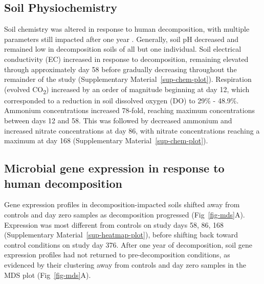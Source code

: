 \documentclass[
  sn-nature,
  lineno, referee]{sn-jnl}
\begin{document}
\subsection{Soil Physiochemistry}\label{soil-physiochemistry}

Soil chemistry was altered in response to human decomposition, with
multiple parameters still impacted after one year
\citep{taylor_transient_2024}. Generally, soil pH decreased and remained
low in decomposition soils of all but one individual. Soil electrical
conductivity (EC) increased in response to decomposition, remaining
elevated through approximately day 58 before gradually decreasing
throughout the remainder of the study
(Supplementary Material~\ref{sup-chem-plot}). Respiration (evolved
CO\textsubscript{2}) increased by an order of magnitude beginning at day
12, which corresponded to a reduction in soil dissolved oxygen (DO) to
29\% - 48.9\%. Ammonium concentrations increased 78-fold, reaching
maximum concentrations between days 12 and 58. This was followed by
decreased ammonium and increased nitrate concentrations at day 86, with
nitrate concentrations reaching a maximum at day 168
(Supplementary Material~\ref{sup-chem-plot}).

\subsection{Microbial gene expression in response to human
decomposition}\label{microbial-gene-expression-in-response-to-human-decomposition}

Gene expression profiles in decomposition-impacted soils shifted away
from controls and day zero samples as decomposition progressed
(Fig~\ref{fig-mds}A). Expression was most different from controls on
study days 58, 86, 168 (Supplementary Material~\ref{sup-heatmap-plot}),
before shifting back toward control conditions on study day 376. After
one year of decomposition, soil gene expression profiles had not
returned to pre-decomposition conditions, as evidenced by their
clustering away from controls and day zero samples in the MDS plot
(Fig~\ref{fig-mds}A).
\end{document}
